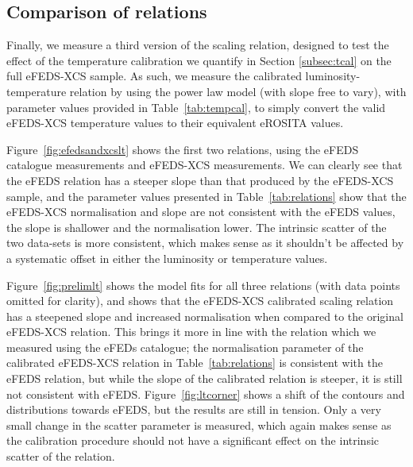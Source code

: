 \documentclass[fleqn,usenatbib]{mnras}
\begin{document}

\subsection{Comparison of relations}
Finally, we measure a third version of the scaling relation, designed to test the effect of the temperature calibration we quantify in Section \ref{subsec:tcal} on the full eFEDS-XCS sample. As such, we measure the calibrated luminosity-temperature relation by using the power law model (with slope free to vary), with parameter values provided in Table~\ref{tab:tempcal}, to simply convert the valid eFEDS-XCS temperature values to their equivalent eROSITA values. 

Figure~\ref{fig:efedsandxcslt} shows the first two relations, using the eFEDS catalogue measurements and eFEDS-XCS measurements. We can clearly see that the eFEDS relation has a steeper slope than that produced by the eFEDS-XCS sample, and the parameter values presented in Table~\ref{tab:relations} show that the eFEDS-XCS normalisation and slope are not consistent with the eFEDS values, the slope is shallower and the normalisation lower. The intrinsic scatter of the two data-sets is more consistent, which makes sense as it shouldn't be affected by a systematic offset in either the luminosity or temperature values.

Figure~\ref{fig:prelimlt} shows the model fits for all three relations (with data points omitted for clarity), and shows that the eFEDS-XCS calibrated scaling relation has a steepened slope and increased normalisation when compared to the original eFEDS-XCS relation. This brings it more in line with the relation which we measured using the eFEDs catalogue; the normalisation parameter of the calibrated eFEDS-XCS relation in Table~\ref{tab:relations} is consistent with the eFEDS relation, but while the slope of the calibrated relation is steeper, it is still not consistent with eFEDS. Figure~\ref{fig:ltcorner} shows a shift of the contours and distributions towards eFEDS, but the results are still in tension. Only a very small change in the scatter parameter is measured, which again makes sense as the calibration procedure should not have a significant effect on the intrinsic scatter of the relation.
\end{document}
